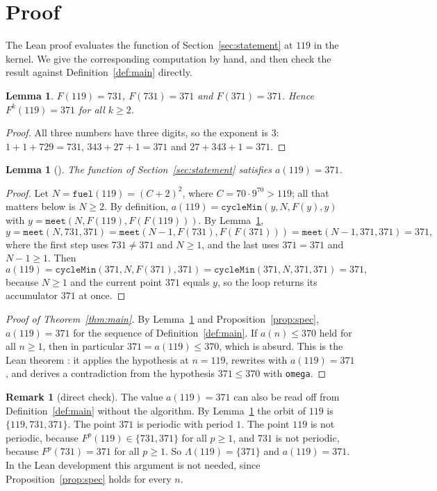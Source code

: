 \documentclass[11pt]{amsart}
\theoremstyle{plain}
\newtheorem{lemma}[theorem]{Lemma}
\theoremstyle{definition}
\newtheorem{remark}[theorem]{Remark}
\newcommand{\Cyc}{\Lambda}
\newcommand{\Lm}[1]{\mathtt{#1}}
\begin{document}
\section{Proof}\label{sec:proof}

The Lean proof evaluates the function  of Section~\ref{sec:statement} at $119$ in the kernel. We give the corresponding computation by hand, and then check the result against Definition~\ref{def:main} directly.

\begin{lemma}\label{lem:orbit}
$F(119)=731$, $F(731)=371$ and $F(371)=371$. Hence $F^k(119)=371$ for all $k\ge2$.
\end{lemma}

\begin{proof}
All three numbers have three digits, so the exponent is $3$: $1+1+729=731$, $343+27+1=371$ and $27+343+1=371$.
\end{proof}

\begin{lemma}[]\label{lem:a119}
The function  of Section~\ref{sec:statement} satisfies $a(119)=371$.
\end{lemma}

\begin{proof}
Let $N=\Lm{fuel}(119)=(C+2)^2$, where $C=70\cdot9^{70}>119$; all that matters below is $N\ge2$. By definition, $a(119)=\Lm{cycleMin}(y,N,F(y),y)$ with $y=\Lm{meet}(N,F(119),F(F(119)))$. By Lemma~\ref{lem:orbit},
\[
  y=\Lm{meet}(N,731,371)=\Lm{meet}(N-1,F(731),F(F(371)))=\Lm{meet}(N-1,371,371)=371,
\]
where the first step uses $731\ne371$ and $N\ge1$, and the last uses $371=371$ and $N-1\ge1$. Then
\[
  a(119)=\Lm{cycleMin}(371,N,F(371),371)=\Lm{cycleMin}(371,N,371,371)=371,
\]
because $N\ge1$ and the current point $371$ equals $y$, so the loop returns its accumulator $371$ at once.
\end{proof}

\begin{proof}[Proof of Theorem~\ref{thm:main}]
By Lemma~\ref{lem:a119} and Proposition~\ref{prop:spec}, $a(119)=371$ for the sequence of Definition~\ref{def:main}. If $a(n)\le370$ held for all $n\ge1$, then in particular $371=a(119)\le370$, which is absurd. This is the Lean theorem : it applies the hypothesis at $n=119$, rewrites with $a(119)=371$, and derives a contradiction from the hypothesis $371\le370$ with \texttt{omega}.
\end{proof}

\begin{remark}[direct check]\label{rem:direct}
The value $a(119)=371$ can also be read off from Definition~\ref{def:main} without the algorithm. By Lemma~\ref{lem:orbit} the orbit of $119$ is $\{119,731,371\}$. The point $371$ is periodic with period $1$. The point $119$ is not periodic, because $F^p(119)\in\{731,371\}$ for all $p\ge1$, and $731$ is not periodic, because $F^p(731)=371$ for all $p\ge1$. So $\Cyc(119)=\{371\}$ and $a(119)=371$. In the Lean development this argument is not needed, since Proposition~\ref{prop:spec} holds for every $n$.
\end{remark}
\end{document}
